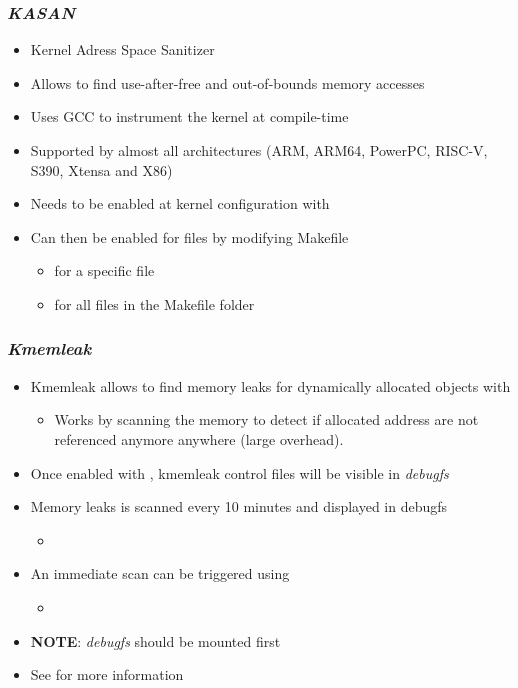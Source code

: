 \begin{frame}
  \frametitle{{\em KASAN}}
  \begin{itemize}
    \item Kernel Adress Space Sanitizer
    \item Allows to find use-after-free and out-of-bounds memory accesses
    \item Uses GCC to instrument the kernel at compile-time
    \item Supported by almost all architectures (ARM, ARM64, PowerPC, RISC-V,
          S390, Xtensa and X86)
    \item Needs to be enabled at kernel configuration with
    \item Can then be enabled for files by modifying Makefile
    \begin{itemize}
      \item {} for a specific file
      \item {} for all files in the Makefile folder
    \end{itemize}
  \end{itemize}
\end{frame}

\begin{frame}
  \frametitle{{\em Kmemleak}}
  \begin{itemize}
    \item Kmemleak allows to find memory leaks for dynamically allocated objects
          with 
    \begin{itemize}
      \item Works by scanning the memory to detect if allocated address are not
            referenced anymore anywhere (large overhead).
    \end{itemize}
    \item Once enabled with , kmemleak control
          files will be visible in {\em debugfs}
    \item Memory leaks is scanned every 10 minutes and displayed in debugfs
    \begin{itemize}
      \item {}
    \end{itemize}
    \item An immediate scan can be triggered using 
    \begin{itemize}
      \item {}
    \end{itemize}
    \item {\bf NOTE}: {\em debugfs} should be mounted first
    \item See  for more information
  \end{itemize}
\end{frame}

